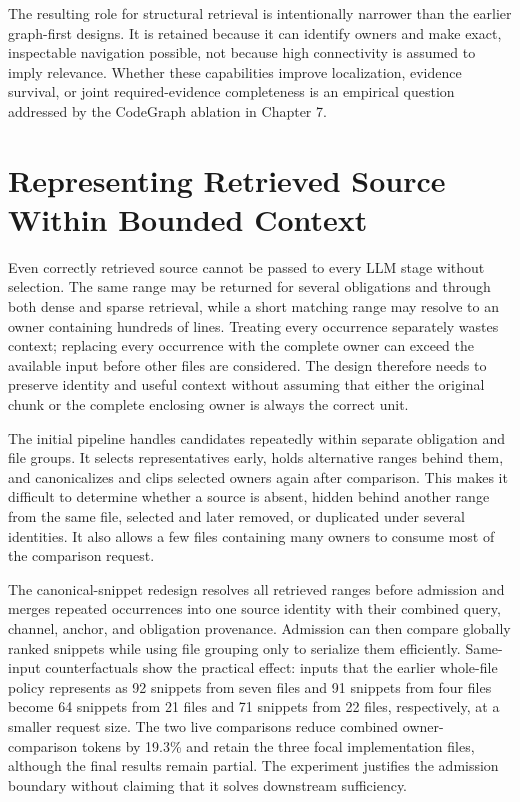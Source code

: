 The resulting role for structural retrieval is intentionally narrower than the earlier graph-first designs. It is retained because it can identify owners and make exact, inspectable navigation possible, not because high connectivity is assumed to imply relevance. Whether these capabilities improve localization, evidence survival, or joint required-evidence completeness is an empirical question addressed by the CodeGraph ablation in Chapter 7.

\section{Representing Retrieved Source Within Bounded Context}\label{sec:representing-retrieved-source-within-bounded-context}

Even correctly retrieved source cannot be passed to every LLM stage without selection. The same range may be returned for several obligations and through both dense and sparse retrieval, while a short matching range may resolve to an owner containing hundreds of lines. Treating every occurrence separately wastes context; replacing every occurrence with the complete owner can exceed the available input before other files are considered. The design therefore needs to preserve identity and useful context without assuming that either the original chunk or the complete enclosing owner is always the correct unit.

The initial pipeline handles candidates repeatedly within separate obligation and file groups. It selects representatives early, holds alternative ranges behind them, and canonicalizes and clips selected owners again after comparison. This makes it difficult to determine whether a source is absent, hidden behind another range from the same file, selected and later removed, or duplicated under several identities. It also allows a few files containing many owners to consume most of the comparison request.

The canonical-snippet redesign resolves all retrieved ranges before admission and merges repeated occurrences into one source identity with their combined query, channel, anchor, and obligation provenance. Admission can then compare globally ranked snippets while using file grouping only to serialize them efficiently. Same-input counterfactuals show the practical effect: inputs that the earlier whole-file policy represents as 92 snippets from seven files and 91 snippets from four files become 64 snippets from 21 files and 71 snippets from 22 files, respectively, at a smaller request size. The two live comparisons reduce combined owner-comparison tokens by 19.3\% and retain the three focal implementation files, although the final results remain partial. The experiment justifies the admission boundary without claiming that it solves downstream sufficiency.

